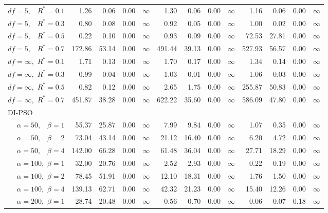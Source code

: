 \documentclass[12pt]{article}
\begin{document}
\begin{table}[ht]
{\begin{tabular}{r|rrrr|rrrr|rrrr}
  $df = 5,\enspace$ $R^* =0.1$ & 1.26 & 0.06 & 0.00 & $\infty$ & 1.30 & 0.06 & 0.00 & $\infty$ & 1.16 & 0.06 & 0.00 & $\infty$ \\ 
  $df = 5,\enspace$ $R^* =0.3$ & 0.80 & 0.08 & 0.00 & $\infty$ & 0.92 & 0.05 & 0.00 & $\infty$ & 1.00 & 0.02 & 0.00 & $\infty$ \\ 
  $df = 5,\enspace$ $R^* =0.5$ & 0.22 & 0.10 & 0.00 & $\infty$ & 0.93 & 0.09 & 0.00 & $\infty$ & 72.53 & 27.81 & 0.00 & $\infty$ \\ 
  $df = 5,\enspace$ $R^* =0.7$ & 172.86 & 53.14 & 0.00 & $\infty$ & 491.44 & 39.13 & 0.00 & $\infty$ & 527.93 & 56.57 & 0.00 & $\infty$ \\ 
  $df = \infty,$ $R^* =0.1$ & 1.71 & 0.13 & 0.00 & $\infty$ & 1.70 & 0.17 & 0.00 & $\infty$ & 1.34 & 0.14 & 0.00 & $\infty$ \\ 
  $df = \infty,$ $R^* =0.3$ & 0.99 & 0.04 & 0.00 & $\infty$ & 1.03 & 0.01 & 0.00 & $\infty$ & 1.06 & 0.03 & 0.00 & $\infty$ \\ 
  $df = \infty,$ $R^* =0.5$ & 0.82 & 0.12 & 0.00 & $\infty$ & 2.65 & 1.75 & 0.00 & $\infty$ & 255.87 & 50.83 & 0.00 & $\infty$ \\ 
  $df = \infty,$ $R^* =0.7$ & 451.87 & 38.28 & 0.00 & $\infty$ & 622.22 & 35.60 & 0.00 & $\infty$ & 586.09 & 47.80 & 0.00 & $\infty$ \\ 
\hline
\multicolumn{1}{l|}{DI-PSO} &&&&&&&&&&&&\\
  $\alpha = 50,\enspace$ $\beta =1$ & 55.37 & 25.87 & 0.00 & $\infty$ & 7.99 & 9.84 & 0.00 & $\infty$ & 1.07 & 0.35 & 0.00 & $\infty$ \\ 
  $\alpha = 50,\enspace$ $\beta =2$ & 73.04 & 43.14 & 0.00 & $\infty$ & 21.12 & 16.40 & 0.00 & $\infty$ & 6.20 & 4.72 & 0.00 & $\infty$ \\ 
  $\alpha = 50,\enspace$ $\beta =4$ & 142.00 & 66.28 & 0.00 & $\infty$ & 61.48 & 36.04 & 0.00 & $\infty$ & 27.71 & 18.29 & 0.00 & $\infty$ \\ 
  $\alpha = 100,$ $\beta =1$ & 32.00 & 20.76 & 0.00 & $\infty$ & 2.52 & 2.93 & 0.00 & $\infty$ & 0.22 & 0.19 & 0.00 & $\infty$ \\ 
  $\alpha = 100,$ $\beta =2$ & 78.45 & 51.91 & 0.00 & $\infty$ & 12.10 & 18.31 & 0.00 & $\infty$ & 1.76 & 1.50 & 0.00 & $\infty$ \\ 
  $\alpha = 100,$ $\beta =4$ & 139.13 & 62.71 & 0.00 & $\infty$ & 42.32 & 21.23 & 0.00 & $\infty$ & 15.40 & 12.26 & 0.00 & $\infty$ \\ 
  $\alpha = 200,$ $\beta =1$ & 28.74 & 20.48 & 0.00 & $\infty$ & 0.56 & 0.70 & 0.00 & $\infty$ & 0.06 & 0.07 & 0.18 & $\infty$ \\ 

\end{tabular}}
\end{table}
\end{document}
